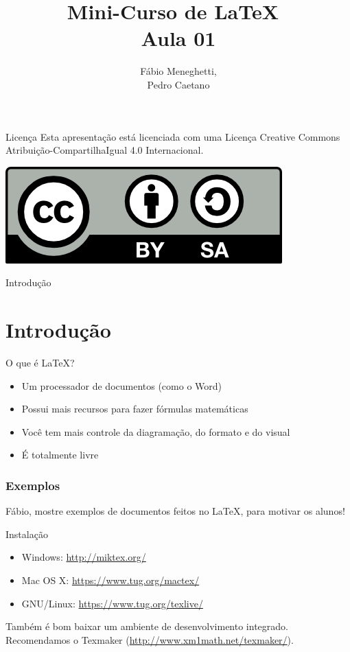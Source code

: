 \documentclass[12pt]{beamer}
\title{Mini-Curso de \LaTeX\ \\ Aula 01}
\author{Fábio Meneghetti,\\
Pedro Caetano}
\date{}
\begin{document}
  \begin{frame}
    \titlepage
  \end{frame}

\begin{frame}{Licença}
    Esta apresentação está licenciada com uma Licença Creative Commons Atribuição-CompartilhaIgual 4.0 Internacional.
    \begin{center}
      \includegraphics[scale=0.3]{../license.png}
    \end{center}
\end{frame}

  \begin{frame}{Introdução}
    \section{Introdução}
    \begin{large}O que é \LaTeX?\end{large}

    \begin{itemize}
      \item Um processador de documentos (como o Word)
      \item Possui mais recursos para fazer fórmulas matemáticas
      \item Você tem mais controle da diagramação, do formato e do visual
      \item É totalmente livre
    \end{itemize}

  \end{frame}

  \begin{frame}
    \frametitle{Exemplos}
    Fábio, mostre exemplos de documentos feitos no \LaTeX, para motivar os alunos!
  \end{frame}

\begin{frame}{Instalação}
    \begin{itemize}
      \item Windows: \url{http://miktex.org/}
      \item Mac OS X: \url{https://www.tug.org/mactex/}
      \item GNU/Linux: \url{https://www.tug.org/texlive/}
    \end{itemize}
    Também é bom baixar um ambiente de desenvolvimento integrado. Recomendamos o Texmaker (\url{http://www.xm1math.net/texmaker/}).
\end{frame}
\end{document}
